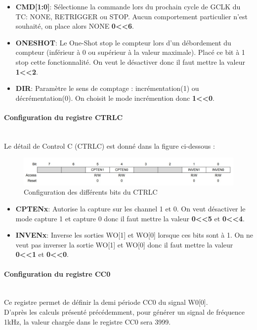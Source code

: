 \documentclass[a4paper]{article}
\begin{document}
	\begin{itemize}
		\item {\bf CMD[1:0]}: Sélectionne la commande lors du prochain cycle de GCLK du TC: NONE, RETRIGGER ou STOP. Aucun comportement particulier n’est souhaité, on place alors NONE {\bf 0\textless\textless6}.~~\\
		\item {\bf ONESHOT}: Le One-Shot stop le compteur lors d’un débordement du compteur (inférieur à 0 ou supérieur à la valeur maximale). Placé ce bit à 1 stop cette fonctionnalité. On veut le désactiver donc il faut mettre la valeur {\bf 1\textless\textless2}.~~\\
		\item {\bf DIR}: Paramètre le sens de comptage : incrémentation(1) ou décrémentation(0). On choisit le mode incrémention donc {\bf 1\textless\textless0}.~~\\
	\end{itemize}
	
	\paragraph{Configuration du registre CTRLC} 
	~~\\
	Le détail de Control C (CTRLC) est donné dans la figure ci-dessous :
	\begin{figure}[H]
		\centering
		\includegraphics[width=0.9\linewidth]{CTRLC.jpg}
		\caption{Configuration des différents bits du CTRLC}
	\end{figure}
	
	\begin{itemize}
		\item {\bf CPTENx}: Autorise la capture sur les channel 1 et 0. On veut désactiver le mode capture 1 et capture 0 donc il faut mettre la valeur {\bf 0\textless\textless5} et {\bf 0\textless\textless4}.~~\\
		\item {\bf INVENx}: Inverse les sorties WO[1] et WO[0] lorsque ces bits sont à 1. On ne veut pas inverser la sortie WO[1] et WO[0] donc il faut mettre la valeur {\bf 0\textless\textless1} et {\bf 0\textless\textless0}.~~\\
	\end{itemize}
	
	\paragraph{Configuration du registre CC0} 
	~~\\
	Ce registre permet de définir la demi période CC0 du signal W0[0]. \\
	D’après les calculs présenté précédemment, pour générer un signal de fréquence 1kHz, la valeur chargée dans le registre CC0 sera 3999.\\
	
\end{document}
